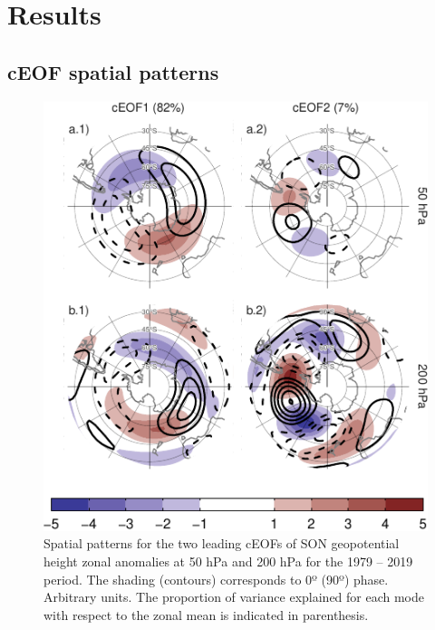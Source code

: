 \documentclass[pdflatex,lineno,sn-basic]{sn-jnl}
\theoremstyle{thmstyleone}%
\theoremstyle{thmstyletwo}%
\theoremstyle{thmstylethree}%
\begin{document}
\hypertarget{results}{%
\section{Results}\label{results}}

\hypertarget{spatial}{%
\subsection{cEOF spatial patterns}\label{spatial}}



\begin{figure}
\centering
\includegraphics{shceof_files/figure-latex/ceofs-1-1.pdf}
\caption{\label{fig:ceofs-1}Spatial patterns for the two leading cEOFs of SON geopotential height zonal anomalies at 50 hPa and 200 hPa for the 1979 -- 2019 period. The shading (contours) corresponds to 0º (90º) phase. Arbitrary units. The proportion of variance explained for each mode with respect to the zonal mean is indicated in parenthesis.}
\end{figure}
\end{document}
